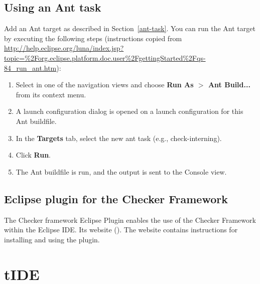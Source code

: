 \subsection{Using an Ant task\label{eclipse-ant}}

Add an Ant target as described in Section~\ref{ant-task}.  You can
run the Ant target by executing the following steps
(instructions copied from {\codesize\url{http://help.eclipse.org/luna/index.jsp?topic=%2Forg.eclipse.platform.doc.user%2FgettingStarted%2Fqs-84_run_ant.htm}}):

\begin{enumerate}

\item
  Select  in one of the navigation views and choose
  {\bf Run As $>$ Ant Build...} from its context menu.

\item
  A launch configuration dialog is opened on a launch configuration
  for this Ant buildfile.

\item
  In the {\bf Targets} tab, select the new ant task (e.g., check-interning).

\item
  Click {\bf Run}.

\item
  The Ant buildfile is run, and the output is sent to the Console view.

\end{enumerate}


\label{eclipse-plug-in}         %
\subsection{Eclipse plugin for the Checker Framework\label{eclipse-plugin}}

The Checker framework Eclipse Plugin enables the use of the Checker
Framework within the Eclipse IDE\@.
Its website ().
The website contains instructions for installing and using the plugin.


\section{tIDE\label{tide}}

